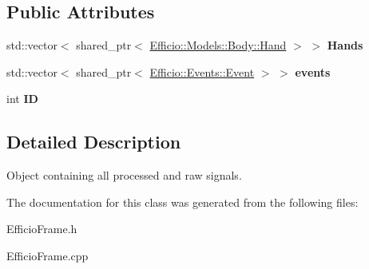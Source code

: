 \subsection*{Public Attributes}
\begin{DoxyCompactItemize}
\item 
std\+::vector$<$ shared\+\_\+ptr$<$ \hyperlink{class_efficio_1_1_models_1_1_body_1_1_hand}{Efficio\+::\+Models\+::\+Body\+::\+Hand} $>$ $>$ {\bfseries Hands}\hypertarget{class_efficio_1_1_efficio_frame_a5dae098702292337ffd8b42a73aff4f1}{}\label{class_efficio_1_1_efficio_frame_a5dae098702292337ffd8b42a73aff4f1}

\item 
std\+::vector$<$ shared\+\_\+ptr$<$ \hyperlink{class_efficio_1_1_events_1_1_event}{Efficio\+::\+Events\+::\+Event} $>$ $>$ {\bfseries events}\hypertarget{class_efficio_1_1_efficio_frame_ad17423c3df18d08484817b511f5ccec9}{}\label{class_efficio_1_1_efficio_frame_ad17423c3df18d08484817b511f5ccec9}

\item 
int {\bfseries ID}\hypertarget{class_efficio_1_1_efficio_frame_aa994a72ec58afb3b6b64b9e05a9d0ba9}{}\label{class_efficio_1_1_efficio_frame_aa994a72ec58afb3b6b64b9e05a9d0ba9}

\end{DoxyCompactItemize}


\subsection{Detailed Description}
Object containing all processed and raw signals. 

The documentation for this class was generated from the following files\+:\begin{DoxyCompactItemize}
\item 
Efficio\+Frame.\+h\item 
Efficio\+Frame.\+cpp\end{DoxyCompactItemize}
